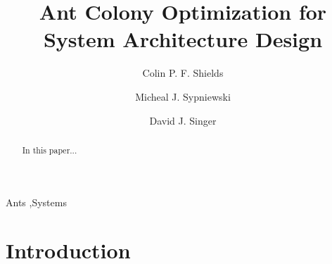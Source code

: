 \documentclass[preprint,12pt,authoryear]{elsarticle}
\begin{document}
\begin{frontmatter}



\title{Ant Colony Optimization for System Architecture Design}


\author[label1,cor1]{Colin P. F. Shields}
\author[label1]{Micheal J. Sypniewski}
\author[label1]{David J. Singer}

\address[label1]{Department of Naval Architecture and Marine Engineering, University of Michigan}

\begin{abstract}
In this paper...

\end{abstract}

\begin{keyword}



Ants \sep Systems

\end{keyword}

\end{frontmatter}


\section{Introduction}
\label{}
\end{document}
